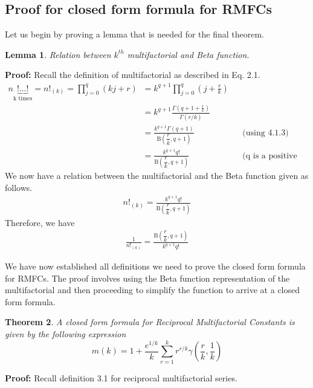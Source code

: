 \documentclass[12pt]{article}
\numberwithin{equation}{section}
\newcommand{\QED}{\tag*{$\square$}}
\newtheorem{theorem}{Theorem}[section]
\newtheorem{lemma}[theorem]{Lemma}
\begin{document}
\subsection{Proof for closed form formula for RMFCs}
Let us begin by proving a lemma that is needed for the final theorem.
\begin{lemma}
Relation between $k^{th}$ multifactorial and Beta function.
\end{lemma}
\textbf{Proof: }Recall the definition of multifactorial as described in Eq. 2.1.
\begin{align*}
    n\underbrace{!\ldots!}_{\text{k times}}=n!_{(k)}=\prod_{j=0}^q(kj+r)&=k^{q+1}\prod_{j=0}^q\left(j+\frac rk\right)\\
&=k^{q+1}\frac{\Gamma(q+1+\frac{r}{k})}{\Gamma(r/k)}\\
&=\frac{k^{q+1}\Gamma(q+1)}{\mathrm{B}\left (\dfrac{r}{k}, q+1\right )} && \text{(using 4.1.3)}\\
&=\frac{k^{q+1}q!}{\mathrm{B}\left (\dfrac{r}{k}, q+1\right )} && \text{(q is a positive integer)}
\end{align*}
We now have a relation between the multifactorial and the Beta function given as follows.
\begin{align}
    n!_{(k)}=\frac{k^{q+1}q!}{\mathrm{B}\left (\dfrac{r}{k}, q+1\right )}
\end{align}
Therefore, we have 
\begin{align*}
    \frac{1}{n!_{(k)}}=\frac{\mathrm{B}\left (\dfrac{r}{k}, q+1\right )}{k^{q+1}q!} \QED
\end{align*}\par
We have now established all definitions we need to prove the closed form formula for RMFCs. The proof involves using the Beta function representation of the multifactorial and then proceeding to simplify the function to arrive at a closed form formula.\cite{RMFCwolfram}\cite{stackproof}
\begin{theorem}A closed form formula for Reciprocal Multifactorial Constants is given by the following expression
$$m(k)=1+\frac{e^{1/k}}{k}\sum_{r=1}^{k}r^{r/k}\gamma\left ( \frac{r}{k}, \frac{1}{k} \right )$$
\end{theorem}\par 
\textbf{Proof: }Recall definition 3.1 for reciprocal multifactorial series.
\end{document}
